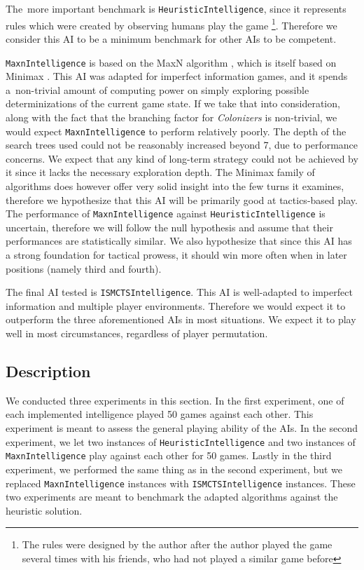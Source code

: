 The~more important benchmark is \texttt{HeuristicIntelligence}, since it represents
rules which were created by observing humans play the game
\footnote{The rules were designed by the author after the author played the game
several times with his friends, who had not played a similar game before}.
Therefore we consider this
AI to be a minimum benchmark for other AIs to be competent.

\texttt{MaxnIntelligence} is based on the MaxN algorithm \cite{Luckhardt86}, which
is itself based on Minimax \cite{Millington09}. This AI was adapted for imperfect
information games, and it spends a~non-trivial amount of computing power
on simply exploring possible determinizations of the current game state.
If we take that into consideration, along with the fact that the branching factor
for \emph{Colonizers} is non-trivial, we would expect \texttt{MaxnIntelligence}
to perform relatively poorly. The depth of the search trees used could not be
reasonably increased beyond 7, due to performance concerns. We expect that any kind of
long-term strategy could not be achieved by it since it lacks the necessary
exploration depth. The Minimax family of algorithms does however offer very
solid insight into the few turns it examines, therefore we hypothesize that this AI will be
primarily good at tactics-based play. The performance of \texttt{MaxnIntelligence}
against \texttt{HeuristicIntelligence} is uncertain, therefore we will follow the null
hypothesis and assume that their performances are statistically similar.
We also hypothesize that since this AI has a strong foundation for tactical prowess,
it should win more often when in later positions (namely third and fourth).

The final AI tested is \texttt{ISMCTSIntelligence}. This AI is well-adapted to
imperfect information and multiple player environments. Therefore we would expect
it to outperform the three aforementioned AIs in most situations. We expect it
to play well in most circumstances, regardless of player permutation.

\subsection{Description}

We conducted three experiments in this section. In the first experiment, one of each
implemented intelligence played 50 games against each other. This experiment is meant
to assess the general playing ability of the AIs. In the second experiment, we
let two instances of \texttt{HeuristicIntelligence} and two instances of
\texttt{MaxnIntelligence} play against each other for 50 games.
Lastly in the third experiment, we performed the same thing as in the second experiment,
but we replaced \texttt{MaxnIntelligence} instances with \texttt{ISMCTSIntelligence}
instances. These two experiments are meant to benchmark the adapted algorithms
against the heuristic solution.

